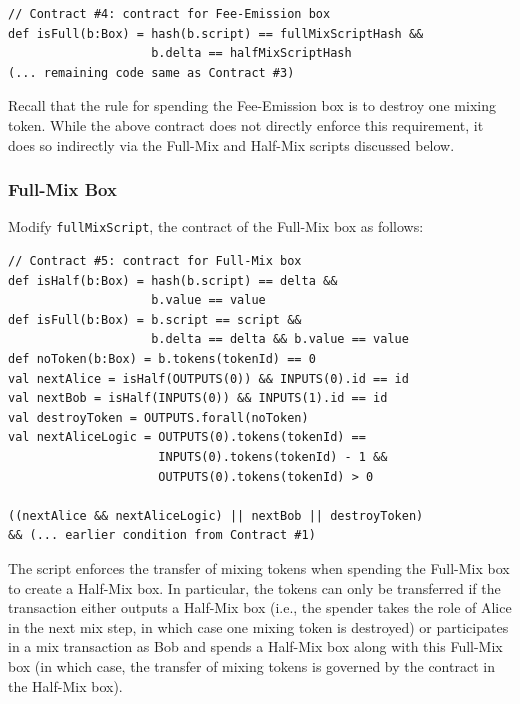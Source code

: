 \documentclass[runningheads]{llncs}
\begin{document}
{\small
\begin{Verbatim}[frame=single]
// Contract #4: contract for Fee-Emission box
def isFull(b:Box) = hash(b.script) == fullMixScriptHash && 
                    b.delta == halfMixScriptHash
(... remaining code same as Contract #3)                    
\end{Verbatim}
}

Recall that the rule for spending the Fee-Emission box is to destroy one mixing token. While the above contract does not directly enforce this requirement, it does so indirectly via the Full-Mix and Half-Mix scripts discussed below.

\subsubsection{Full-Mix Box}

Modify \texttt{fullMixScript}, the contract of the Full-Mix box as follows: 
{\small
\begin{Verbatim}[frame=single]
// Contract #5: contract for Full-Mix box
def isHalf(b:Box) = hash(b.script) == delta && 
                    b.value == value
def isFull(b:Box) = b.script == script &&
                    b.delta == delta && b.value == value
def noToken(b:Box) = b.tokens(tokenId) == 0
val nextAlice = isHalf(OUTPUTS(0)) && INPUTS(0).id == id
val nextBob = isHalf(INPUTS(0)) && INPUTS(1).id == id
val destroyToken = OUTPUTS.forall(noToken)
val nextAliceLogic = OUTPUTS(0).tokens(tokenId) == 
                     INPUTS(0).tokens(tokenId) - 1 && 
                     OUTPUTS(0).tokens(tokenId) > 0

((nextAlice && nextAliceLogic) || nextBob || destroyToken) 
&& (... earlier condition from Contract #1)
\end{Verbatim}
}

The script enforces the transfer of mixing tokens when spending the Full-Mix box to create a Half-Mix box. In particular, the tokens can only be transferred if the transaction either outputs a Half-Mix box (i.e., the spender takes the role of Alice in the next mix step, in which case one mixing token is destroyed) or participates in a mix transaction as Bob and spends a Half-Mix box along with this Full-Mix box (in which case, the transfer of mixing tokens is governed by the contract in the Half-Mix box).
\end{document}
